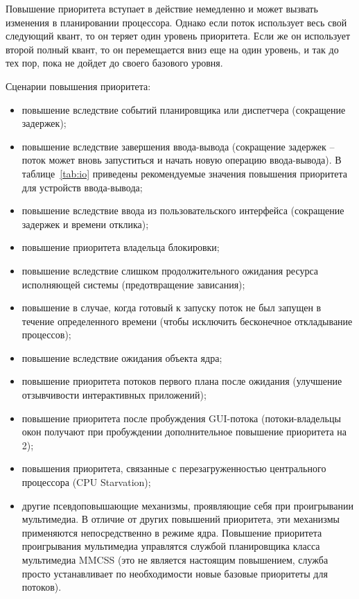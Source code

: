 \documentclass[a4paper, 12pt]{extreport}
\begin{document}
Повышение приоритета вступает в действие немедленно и может  вызвать изменения в планировании процессора. Однако если 
поток использует весь свой следующий квант, то он теряет один уровень приоритета. Если же он использует второй полный 
квант, то он перемещается вниз еще на один уровень, и так до тех пор, пока не дойдет до своего базового уровня. 

Сценарии повышения приоритета:
\begin{itemize}
	\item повышение вследствие событий планировщика или диспетчера (сокращение задержек);
	\item повышение вследствие завершения ввода-вывода (сокращение задержек -- поток может вновь запуститься и начать 
	новую операцию ввода-вывода). В таблице~\ref{tab:io} приведены рекомендуемые значения повышения приоритета для 
	устройств ввода-вывода;
	\item повышение вследствие ввода из пользовательского интерфейса (сокращение задержек и времени отклика);
	\item повышение приоритета владельца блокировки;
	\item повышение вследствие слишком продолжительного ожидания ресурса исполняющей системы (предотвращение 
	зависания);
	\item повышение в случае, когда готовый к запуску поток не был запущен в течение определенного времени (чтобы 
	исключить бесконечное откладывание процессов);
	\item повышение вследствие ожидания объекта ядра;
	\item повышение приоритета потоков первого плана после ожидания (улучшение отзывчивости интерактивных 
	приложений);
	\item повышение приоритета после пробуждения GUI-потока (потоки-владельцы окон получают при пробуждении 
	дополнительное повышение приоритета на 2);
	\item повышения приоритета, связанные с перезагруженностью центрального процессора (CPU Starvation);
	\item другие псевдоповышающие механизмы, проявляющие себя при проигрывании мультимедиа. В отличие от других 
	повышений приоритета, эти механизмы применяются непосредственно в режиме ядра. Повышение приоритета 
	проигрывания мультимедиа управлятся службой планировщика класса мультимедиа MMCSS (это не является настоящим 
	повышением, служба просто устанавливает по необходимости новые базовые приоритеты для потоков).
\end{itemize}
\end{document}
